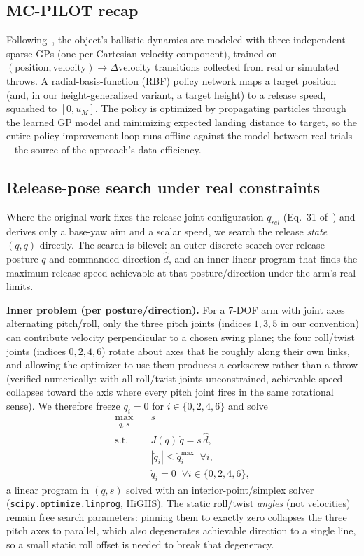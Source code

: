 \documentclass[conference]{IEEEtran}
\begin{document}
\subsection{MC-PILOT recap}
Following~\cite{turcato2025mcpilot}, the object's ballistic dynamics are
modeled with three independent sparse GPs (one per Cartesian velocity
component), trained on $(\text{position}, \text{velocity}) \to
\Delta\text{velocity}$ transitions collected from real or simulated
throws. A radial-basis-function (RBF) policy network maps a target position
(and, in our height-generalized variant, a target height) to a release
speed, squashed to $[0, u_M]$. The policy is optimized by propagating
particles through the learned GP model and minimizing expected landing
distance to target, so the entire policy-improvement loop runs offline
against the model between real trials -- the source of the approach's data
efficiency.

\subsection{Release-pose search under real constraints}
\label{sec:method-search}
Where the original work fixes the release joint configuration $q_{rel}$
(Eq.~31 of~\cite{turcato2025mcpilot}) and derives only a base-yaw aim and a
scalar speed, we search the release \emph{state} $(q, \dot q)$ directly.
The search is bilevel: an outer discrete search over release posture $q$
and commanded direction $\hat d$, and an inner linear program that finds
the maximum release speed achievable at that posture/direction under the
arm's real limits.

\textbf{Inner problem (per posture/direction).} For a 7-DOF arm with joint
axes alternating pitch/roll, only the three pitch joints (indices $1,3,5$
in our convention) can contribute velocity perpendicular to a chosen swing
plane; the four roll/twist joints (indices $0,2,4,6$) rotate about axes
that lie roughly along their own links, and allowing the optimizer to use
them produces a corkscrew rather than a throw (verified numerically: with
all roll/twist joints unconstrained, achievable speed collapses toward the
axis where every pitch joint fires in the same rotational sense). We
therefore freeze $\dot q_i = 0$ for $i \in \{0,2,4,6\}$ and solve
\begin{equation}
\begin{aligned}
\max_{\dot q,\, s} \quad & s \\
\text{s.t.} \quad & J(q)\,\dot q = s\,\hat d, \\
& |\dot q_i| \le \dot q_i^{\max} \;\; \forall i, \\
& \dot q_i = 0 \;\; \forall i \in \{0,2,4,6\},
\end{aligned}
\label{eq:release-lp}
\end{equation}
a linear program in $(\dot q, s)$ solved with an interior-point/simplex
solver (\texttt{scipy.optimize.linprog}, HiGHS). The static roll/twist
\emph{angles} (not velocities) remain free search parameters: pinning them
to exactly zero collapses the three pitch axes to parallel, which also
degenerates achievable direction to a single line, so a small static roll
offset is needed to break that degeneracy.
\end{document}
